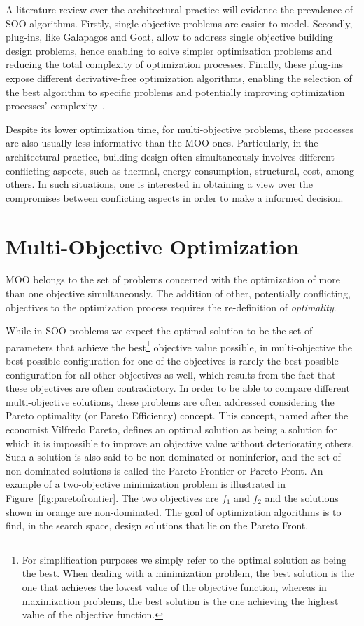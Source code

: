 	A literature review over the architectural practice will evidence the prevalence of \ac{SOO} algorithms. Firstly, single-objective problems are easier to model. Secondly, plug-ins, like Galapagos and Goat, allow to address single objective building design problems, hence enabling to solve simpler optimization problems and reducing the total complexity of optimization processes. Finally, these plug-ins expose different derivative-free optimization algorithms, enabling the selection of the best algorithm to specific problems and potentially improving optimization processes' complexity~\cite{Wortmann2016BBO}. 
			
	Despite its lower optimization time, for multi-objective problems,  these processes are also usually less informative than the \ac{MOO} ones. Particularly, in the architectural practice, building design often simultaneously involves different conflicting aspects, such as thermal, energy consumption, structural, cost, among others. In such situations, one is interested in obtaining a view over the compromises between conflicting aspects in order to make a informed decision.
	
\section{Multi-Objective Optimization}

	\ac{MOO} belongs to the set of problems concerned with the optimization of more than one objective simultaneously. The addition of other, potentially conflicting, objectives to the optimization process requires the re-definition of \textit{optimality}. 

	While in \ac{SOO} problems we expect the optimal solution to be the set of parameters that achieve the best\footnote{For simplification purposes we simply refer to the optimal solution as being the best. When dealing with a minimization problem, the best solution is the one that achieves the lowest value of the objective function, whereas in maximization problems, the best solution is the one achieving the highest value of the objective function.} objective value possible, in multi-objective the best possible configuration for one of the objectives is rarely the best possible configuration for all other objectives as well, which results from the fact that these objectives are often contradictory. In order to be able to compare different multi-objective solutions, these problems are often addressed considering the Pareto optimality (or Pareto Efficiency) concept. This concept, named after the economist Vilfredo Pareto, defines an optimal solution as being a solution for which it is impossible to improve an objective value without deteriorating others. Such a solution is also said to be non-dominated or noninferior, and the set of non-dominated solutions is called the Pareto Frontier or Pareto Front. An example of a two-objective minimization problem is illustrated in Figure~\ref{fig:paretofrontier}. The two objectives are $f_1$ and $f_2$ and the solutions shown in orange are non-dominated. The goal of optimization algorithms is to find, in the search space, design solutions that lie on the Pareto Front.

